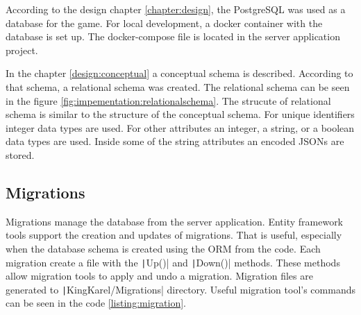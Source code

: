 According to the design chapter \ref{chapter:design}, the PostgreSQL was used as a database for the game.
For local development, a docker container with the database is set up.
The docker-compose file is located in the server application project.

In the chapter \ref{design:conceptual} a conceptual schema is described.
According to that schema, a relational schema was created.
The relational schema can be seen in the figure \ref{fig:impementation:relationalschema}.
The strucute of relational schema is similar to the structure of the conceptual schema.
For unique identifiers integer data types are used.
For other attributes an integer, a string, or a boolean data types are used.
Inside some of the string attributes an encoded JSONs are stored.

\subsection{Migrations}

Migrations manage the database from the server application.
Entity framework tools support the creation and updates of migrations.
That is useful, especially when the database schema is created using the ORM from the code.
Each migration create a file with the \texttt|Up()| and \texttt|Down()| methods.
These methods allow migration tools to apply and undo a migration.
Migration files are generated to \texttt|KingKarel/Migrations| directory.
Useful migration tool's commands can be seen in the code \ref{listing:migration}.
